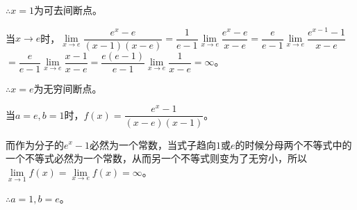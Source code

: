 \documentclass[UTF8, 12pt]{ctexart}
\begin{document}
$\therefore x=1$为可去间断点。\medskip

当$x\to e$时，$\lim\limits_{x\to e}\dfrac{e^x-e}{(x-1)(x-e)}$$=\dfrac{1}{e-1}\lim\limits_{x\to e}\dfrac{e^x-e}{x-e}$$=\dfrac{e}{e-1}\lim\limits_{x\to e}\dfrac{e^{x-1}-1}{x-e}$\medskip$=\dfrac{e}{e-1}\lim\limits_{x\to e}\dfrac{x-1}{x-e}$$=\dfrac{e(e-1)}{e-1}\lim\limits_{x\to e}\dfrac{1}{x-e}=\infty$。\medskip

$\therefore x=e$为无穷间断点。\medskip

当$a=e,b=1$时，$f(x)=\dfrac{e^x-1}{(x-e)(x-1)}$。\medskip

而作为分子的$e^x-1$必然为一个常数，当式子趋向$1$或$e$的时候分母两个不等式中的一个不等式必然为一个常数，从而另一个不等式则变为了无穷小，所以$\lim\limits_{x\to 1}f(x)=\lim\limits_{x\to e}f(x)=\infty$。

$\therefore a=1,b=e$。
\end{document}
